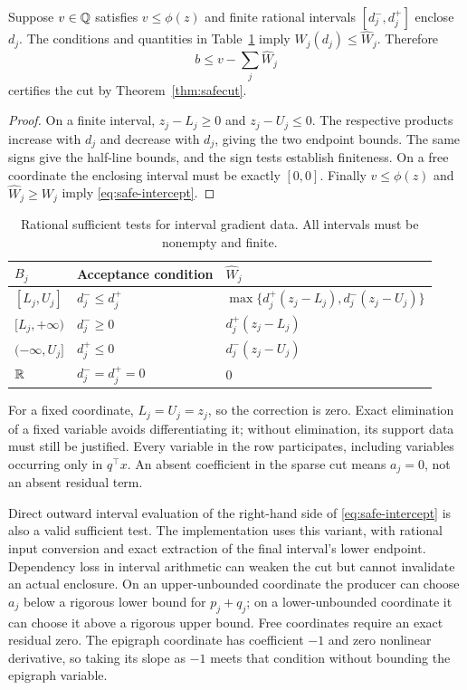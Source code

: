 \begin{corollary}
\label{cor:enclosure}
Suppose $v\in\mathbb{Q}$ satisfies $v\leq\phi(z)$ and finite rational intervals $[d_j^-,d_j^+]$ enclose $d_j$. The conditions and quantities in Table~\ref{tab:enclosure} imply $W_j(d_j)\leq\widehat W_j$. Therefore
\begin{equation}
 b\leq v-\sum_j\widehat W_j
 \label{eq:rational-enclosure-test}
\end{equation}
certifies the cut by Theorem~\ref{thm:safecut}.
\end{corollary}
\begin{proof}
On a finite interval, $z_j-L_j\geq0$ and $z_j-U_j\leq0$. The respective products increase with $d_j$ and decrease with $d_j$, giving the two endpoint bounds. The same signs give the half-line bounds, and the sign tests establish finiteness. On a free coordinate the enclosing interval must be exactly $[0,0]$. Finally $v\leq\phi(z)$ and $\widehat W_j\geq W_j$ imply \eqref{eq:safe-intercept}.
\end{proof}

\begin{table}[htbp]
\centering
\caption{Rational sufficient tests for interval gradient data. All intervals must be nonempty and finite.}
\label{tab:enclosure}
\begin{tabular}{lll}
\toprule
$B_j$ & Acceptance condition & $\widehat W_j$\\
\midrule
$[L_j,U_j]$ & $d_j^-\leq d_j^+$ & $\max\{d_j^+(z_j-L_j),d_j^-(z_j-U_j)\}$\\
$[L_j,+\infty)$ & $d_j^-\geq0$ & $d_j^+(z_j-L_j)$\\
$(-\infty,U_j]$ & $d_j^+\leq0$ & $d_j^-(z_j-U_j)$\\
$\mathbb{R}$ & $d_j^-=d_j^+=0$ & $0$\\
\bottomrule
\end{tabular}
\end{table}
For a fixed coordinate, $L_j=U_j=z_j$, so the correction is zero. Exact elimination of a fixed variable avoids differentiating it; without elimination, its support data must still be justified. Every variable in the row participates, including variables occurring only in $q^\top x$. An absent coefficient in the sparse cut means $a_j=0$, not an absent residual term.

Direct outward interval evaluation of the right-hand side of \eqref{eq:safe-intercept} is also a valid sufficient test. The implementation uses this variant, with rational input conversion and exact extraction of the final interval's lower endpoint. Dependency loss in interval arithmetic can weaken the cut but cannot invalidate an actual enclosure. On an upper-unbounded coordinate the producer can choose $a_j$ below a rigorous lower bound for $p_j+q_j$; on a lower-unbounded coordinate it can choose it above a rigorous upper bound. Free coordinates require an exact residual zero. The epigraph coordinate has coefficient $-1$ and zero nonlinear derivative, so taking its slope as $-1$ meets that condition without bounding the epigraph variable.

